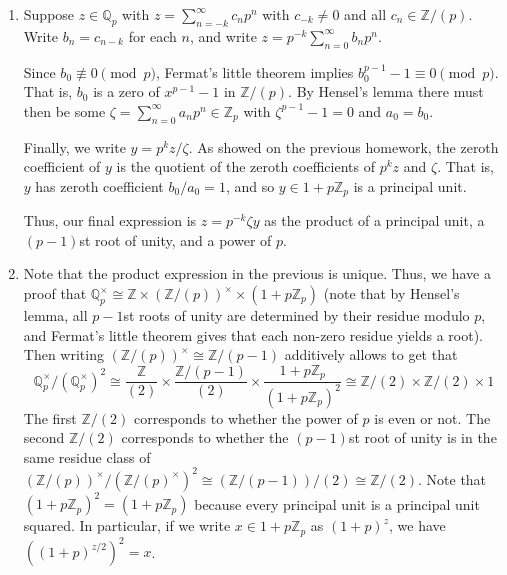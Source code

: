 \documentclass[12 pt, letterpaper]{hmcpset}
\begin{document}
\begin{solution}
	\begin{enumerate}
		\item Suppose $z \in \mathbb{Q}_{p}$ with $z = \sum_{n = -k}^{\infty} c_{n} p^{n}$ with $c_{-k} \neq 0$ and all $c_{n} \in \mathbb{Z} / (p)$. Write $b_{n} = c_{n - k}$ for each $n$, and write $z = p^{-k} \sum_{n = 0}^{\infty} b_{n} p^{n}$. 

			Since $b_{0} \not \equiv 0 \pmod{p}$, Fermat's little theorem implies $b_{0}^{p - 1} - 1 \equiv 0 \pmod p$. That is, $b_{0}$ is a zero of $x^{p - 1} - 1$ in $\mathbb{Z} / (p)$. By Hensel's lemma there must then be some $\zeta = \sum_{n = 0}^{\infty} a_{n} p^{n} \in \mathbb{Z}_{p}$ with $\zeta^{p - 1} - 1 = 0$ and $a_{0} = b_{0}$.

			Finally, we write  $y = p^{k} z / \zeta$. As showed on the previous homework, the zeroth coefficient of $y$ is the quotient of the zeroth coefficients of $p^{k} z$ and $\zeta$. That is, $y$ has zeroth coefficient $b_{0} / a_{0} = 1$, and so $y \in 1 + p \mathbb{Z}_{p}$ is a principal unit.

			Thus, our final expression is $z = p^{-k} \zeta y$ as the product of a principal unit, a $(p - 1)$st root of unity, and a power of $p$.

		\item Note that the product expression in the previous  is unique. Thus, we have a proof that $\mathbb{Q}_{p}^{\times} \cong \mathbb{Z} \times (\mathbb{Z} / (p))^{\times} \times (1 + p \mathbb{Z}_{p})$ (note that by Hensel's lemma, all $p - 1$st roots of unity are determined by their residue modulo $p$, and Fermat's little theorem gives that each non-zero residue yields a root). Then writing $(\mathbb{Z} / (p))^{\times} \cong \mathbb{Z} / (p - 1)$ additively allows to get that
			\[
				\mathbb{Q}_{p}^{\times} / (\mathbb{Q}_{p}^{\times})^{2} \cong \frac{\mathbb{Z}}{(2)} \times \frac{\mathbb{Z} / (p - 1)}{(2)} \times \frac{1 + p \mathbb{Z}_{p}}{(1 + p \mathbb{Z}_{p})^{2}} \cong \mathbb{Z} / (2) \times \mathbb{Z} / (2) \times 1
			\]
			The first $\mathbb{Z} / (2)$ corresponds to whether the power of $p$ is even or not. The second $\mathbb{Z} / (2)$ corresponds to whether the $(p - 1)$st root of unity is in the same residue class of $(\mathbb{Z} / (p))^{\times} / (\mathbb{Z} / (p)^{\times})^{2} \cong (\mathbb{Z} / (p - 1)) / (2) \cong \mathbb{Z} / (2)$. Note that $(1 + p \mathbb{Z}_{p})^{2} = (1 + p \mathbb{Z}_{p})$ because every principal unit is a principal unit squared. In particular, if we write $x \in 1 + p \mathbb{Z}_{p}$ as $(1 + p)^{z}$, we have $((1 + p)^{z / 2})^{2} = x$.


\end{enumerate}
\end{solution}
\end{document}
